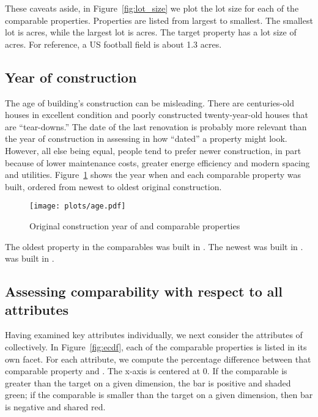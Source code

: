 \documentclass[
12pt, %
letterpaper, %
oneside, %
headinclude,footinclude, %
BCOR5mm, %
]{scrartcl}
\begin{document}
These caveats aside, in Figure~\ref{fig:lot_size} we plot the lot size for each of the comparable properties. 
Properties are listed from largest to smallest.
The smallest lot is \SmallestLot{} acres, while the largest lot is \LargestLot{} acres.
The target property has a lot size of \PropertyLotSize{} acres.
For reference, a US football field is about 1.3 acres.
\ExtremeWarningLargestLot{}
\ExtremeWarningSmallestLot{}

\subsection{Year of construction}
The age of building's construction can be misleading. There are centuries-old houses in excellent condition and poorly constructed twenty-year-old houses that are ``tear-downs.''
The date of the last renovation is probably more relevant than the year of construction in assessing in how ``dated'' a property might look. 
However, all else being equal, people tend to prefer newer construction, in part because of lower maintenance costs, greater energe efficiency and modern spacing and utilities. 
Figure~\ref{fig:age} shows the year when \PropertyName{} and each comparable property was built, ordered from newest to oldest original construction.

\begin{figure}
\centering
\caption{Original construction year of \PropertyName{} and comparable properties} \label{fig:age}  
\texttt{[image: plots/age.pdf]} 
\end{figure}

The oldest property in the comparables was built in \Oldest{}. The newest was built in \Youngest{}.
\PropertyName{} was built in \PropertyYearBuilt{}. 
\ExtremeWarningAgeYoung{}
\ExtremeWarningAgeOld{}

\subsection{Assessing comparability with respect to all attributes}

Having examined key attributes individually, we next consider the attributes of \PropertyName{} collectively.
In Figure~\ref{fig:ecdf}, each of the comparable properties is listed in its own facet.
For each attribute, we compute the percentage difference between that comparable property and \PropertyName{}.
The x-axis is centered at 0.  
If the comparable is greater than the target on a given dimension, the bar is positive and shaded green;
if the comparable is smaller than the target on a given dimension, then bar is negative and shared red. 
\end{document}
